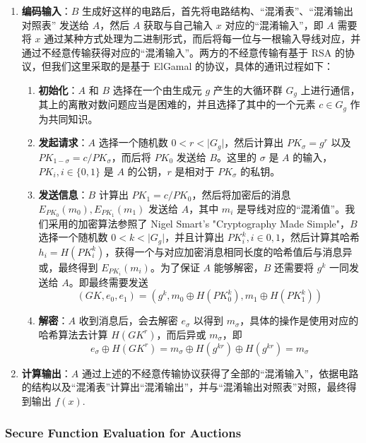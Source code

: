 \begin{enumerate}
    \item \textbf{编码输入}：$B$ 生成好这样的电路后，首先将电路结构、“混淆表”、“混淆输出对照表” 发送给 $A$，然后 $A$ 获取与自己输入 $x$ 对应的“混淆输入”，即 $A$ 需要将 $x$ 通过某种方式处理为二进制形式，而后将每一位与一根输入导线对应，并通过不经意传输获得对应的“混淆输入”。两方的不经意传输有基于 RSA 的协议，但我们这里采取的是基于 ElGamal 的协议，具体的通讯过程如下：\begin{enumerate}
        \item \textbf{初始化}：$A$ 和 $B$ 选择在一个由生成元 $g$ 产生的大循环群 $G_g$ 上进行通信，其上的离散对数问题应当是困难的，并且选择了其中的一个元素 $c \in G_g$ 作为共同知识。
        \item \textbf{发起请求}：$A$ 选择一个随机数 $0 < r < \lvert G_g \rvert$，然后计算出 $PK_{\sigma} = g^r$ 以及 $PK_{1 - \sigma} = c/PK_{\sigma}$，而后将 $PK_0$ 发送给 $B$。这里的 $\sigma$ 是 $A$ 的输入，$PK_i, i \in \{0, 1\}$ 是 $A$ 的公钥，$r$ 是相对于 $PK_{\sigma}$ 的私钥。
        \item \textbf{发送信息}：$B$ 计算出 $PK_1 = c/PK_0$，然后将加密后的消息 $E_{PK_0}(m_0), E_{PK_1}(m_1)$ 发送给 $A$，其中 $m_i$ 是导线对应的“混淆值”。我们采用的加密算法参照了 Nigel Smart's "Cryptography Made Simple"，$B$ 选择一个随机数 $0 < k < \lvert G_g \rvert$，并且计算出 $PK_i^k, i \in {0, 1}$，然后计算其哈希 $h_i = H(PK_i^k)$，获得一个与对应加密消息相同长度的哈希值后与消息异或，最终得到 $E_{PK_i}(m_i)$。为了保证 $A$ 能够解密，$B$ 还需要将 $g^k$ 一同发送给 $A$。即最终需要发送 \[
            (GK, e_0, e_1) = (g^k, m_0 \oplus H(PK_0^k), m_1 \oplus H(PK_1^k))
        \]
        \item \textbf{解密}：$A$ 收到消息后，会去解密 $e_{\sigma}$ 以得到 $m_{\sigma}$，具体的操作是使用对应的哈希算法去计算 $H(GK^r)$，而后异或 $m_{\sigma}$，即 \[
            e_{\sigma} \oplus H(GK^r) = m_{\sigma} \oplus H(g^{kr}) \oplus H(g^{kr}) = m_{\sigma}
        \]
    \end{enumerate}

    \item \textbf{计算输出}：$A$ 通过上述的不经意传输协议获得了全部的“混淆输入”，依据电路的结构以及“混淆表”计算出“混淆输出”，并与“混淆输出对照表”对照，最终得到输出 $f(x)$.


\end{enumerate}

\subsubsection{Secure Function Evaluation for Auctions}

